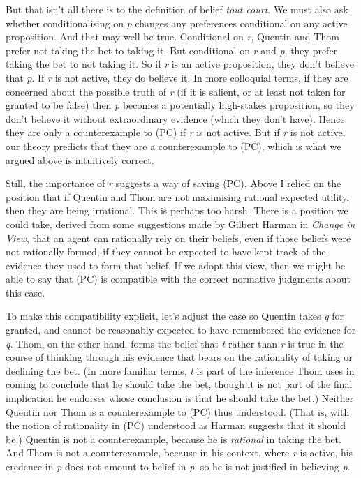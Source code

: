 \documentclass[
  10pt,
  letterpaper,
  DIV=11,
  numbers=noendperiod,
  twoside]{scrartcl}
\begin{document}
But that isn't all there is to the definition of belief \emph{tout
court}. We must also ask whether conditionalising on \emph{p} changes
any preferences conditional on any active proposition. And that may well
be true. Conditional on \emph{r}, Quentin and Thom prefer not taking the
bet to taking it. But conditional on \emph{r} and \emph{p}, they prefer
taking the bet to not taking it. So if \emph{r} is an active
proposition, they don't believe that \emph{p}. If \emph{r} is not
active, they do believe it. In more colloquial terms, if they are
concerned about the possible truth of \emph{r} (if it is salient, or at
least not taken for granted to be false) then \emph{p} becomes a
potentially high-stakes proposition, so they don't believe it without
extraordinary evidence (which they don't have). Hence they are only a
counterexample to (PC) if \emph{r} is not active. But if \emph{r} is not
active, our theory predicts that they are a counterexample to (PC),
which is what we argued above is intuitively correct.

Still, the importance of \emph{r} suggests a way of saving (PC). Above I
relied on the position that if Quentin and Thom are not maximising
rational expected utility, then they are being irrational. This is
perhaps too harsh. There is a position we could take, derived from some
suggestions made by Gilbert Harman in \emph{Change in View}, that an
agent can rationally rely on their beliefs, even if those beliefs were
not rationally formed, if they cannot be expected to have kept track of
the evidence they used to form that belief. If we adopt this view, then
we might be able to say that (PC) is compatible with the correct
normative judgments about this case.

To make this compatibility explicit, let's adjust the case so Quentin
takes \emph{q} for granted, and cannot be reasonably expected to have
remembered the evidence for \emph{q}. Thom, on the other hand, forms the
belief that \emph{t} rather than \emph{r} is true in the course of
thinking through his evidence that bears on the rationality of taking or
declining the bet. (In more familiar terms, \emph{t} is part of the
inference Thom uses in coming to conclude that he should take the bet,
though it is not part of the final implication he endorses whose
conclusion is that he should take the bet.) Neither Quentin nor Thom is
a counterexample to (PC) thus understood. (That is, with the notion of
rationality in (PC) understood as Harman suggests that it should be.)
Quentin is not a counterexample, because he is \emph{rational} in taking
the bet. And Thom is not a counterexample, because in his context, where
\emph{r} is active, his credence in \emph{p} does not amount to belief
in \emph{p}, so he is not justified in believing \emph{p}.
\end{document}
